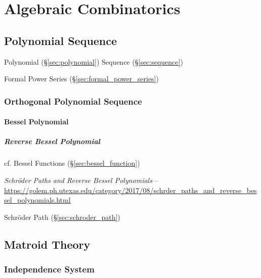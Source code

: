 \section{Algebraic Combinatorics}\label{sec:algebraic_combinatorics}

\subsection{Polynomial Sequence}\label{sec:polynomial_sequence}

Polynomial (\S\ref{sec:polynomial}) Sequence (\S\ref{sec:sequence})

\fist Formal Power Series (\S\ref{sec:formal_power_series})



\subsubsection{Orthogonal Polynomial Sequence}
\label{sec:orthogonal_polynomial_sequence}

\paragraph{Bessel Polynomial}\label{sec:bessel_polynomial}\hfill

\subparagraph{Reverse Bessel Polynomial}\label{sec:reverse_bessel_polynomial}
\hfill

cf. Bessel Functions (\S\ref{sec:bessel_function})

\emph{Schr\"oder Paths and Reverse Bessel Polynomials} --
\url{https://golem.ph.utexas.edu/category/2017/08/schrder_paths_and_reverse_bessel_polynomials.html}

Schr\"oder Path (\S\ref{sec:schroder_path})



\subsection{Matroid Theory}\label{sec:matroid_theory}

\subsubsection{Independence System}\label{sec:independence_system}

